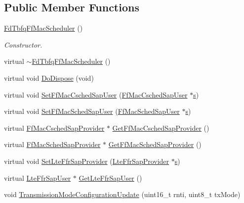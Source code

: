 \subsection*{Public Member Functions}
\begin{DoxyCompactItemize}
\item 
\hyperlink{classns3_1_1FdTbfqFfMacScheduler_ac477fe3176012b8f47af380d23ae8cb2}{Fd\+Tbfq\+Ff\+Mac\+Scheduler} ()
\begin{DoxyCompactList}\small\item\em Constructor. \end{DoxyCompactList}\item 
virtual \hyperlink{classns3_1_1FdTbfqFfMacScheduler_a29f7c9ac864edbbd764276b3d0134479}{$\sim$\+Fd\+Tbfq\+Ff\+Mac\+Scheduler} ()
\item 
virtual void \hyperlink{classns3_1_1FdTbfqFfMacScheduler_a431a7360f10d11e0c015761b460e680a}{Do\+Dispose} (void)
\item 
virtual void \hyperlink{classns3_1_1FdTbfqFfMacScheduler_a7c2df3221f0ace874b71a8a39b3b422d}{Set\+Ff\+Mac\+Csched\+Sap\+User} (\hyperlink{classns3_1_1FfMacCschedSapUser}{Ff\+Mac\+Csched\+Sap\+User} $\ast$\hyperlink{generate__test__data__lte__sinr_8m_ad83eeb3a142285d1243a08c6b7026df8}{s})
\item 
virtual void \hyperlink{classns3_1_1FdTbfqFfMacScheduler_a012f67d3f10f63ed3c0899907cf2f0c1}{Set\+Ff\+Mac\+Sched\+Sap\+User} (\hyperlink{classns3_1_1FfMacSchedSapUser}{Ff\+Mac\+Sched\+Sap\+User} $\ast$\hyperlink{generate__test__data__lte__sinr_8m_ad83eeb3a142285d1243a08c6b7026df8}{s})
\item 
virtual \hyperlink{classns3_1_1FfMacCschedSapProvider}{Ff\+Mac\+Csched\+Sap\+Provider} $\ast$ \hyperlink{classns3_1_1FdTbfqFfMacScheduler_aba8a28cd9c3a16dda5b631baa1d9fa6e}{Get\+Ff\+Mac\+Csched\+Sap\+Provider} ()
\item 
virtual \hyperlink{classns3_1_1FfMacSchedSapProvider}{Ff\+Mac\+Sched\+Sap\+Provider} $\ast$ \hyperlink{classns3_1_1FdTbfqFfMacScheduler_a8e16f360bc391ebcf0a9c65df7227517}{Get\+Ff\+Mac\+Sched\+Sap\+Provider} ()
\item 
virtual void \hyperlink{classns3_1_1FdTbfqFfMacScheduler_a4f73838dc00dc8e3df05c138bfbee369}{Set\+Lte\+Ffr\+Sap\+Provider} (\hyperlink{classns3_1_1LteFfrSapProvider}{Lte\+Ffr\+Sap\+Provider} $\ast$\hyperlink{generate__test__data__lte__sinr_8m_ad83eeb3a142285d1243a08c6b7026df8}{s})
\item 
virtual \hyperlink{classns3_1_1LteFfrSapUser}{Lte\+Ffr\+Sap\+User} $\ast$ \hyperlink{classns3_1_1FdTbfqFfMacScheduler_af7a2c7fdac3cf75075c2c8a29ab37d7b}{Get\+Lte\+Ffr\+Sap\+User} ()
\item 
void \hyperlink{classns3_1_1FdTbfqFfMacScheduler_a8fa3d7ac241a7ebcdb0132790d2bde65}{Transmission\+Mode\+Configuration\+Update} (uint16\+\_\+t rnti, uint8\+\_\+t tx\+Mode)
\end{DoxyCompactItemize}
